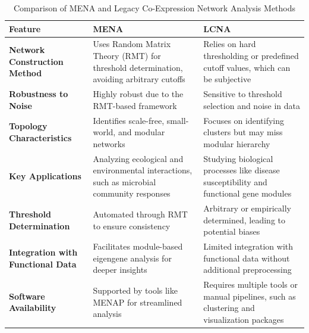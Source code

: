 \begin{table}[H]
\centering
\renewcommand{\arraystretch}{1.5} %
\begin{tabularx}{\textwidth}{@{}p{}X X@{}}
\toprule
\textbf{Feature} & \textbf{MENA} & \textbf{LCNA} \\
\midrule
\textbf{Network Construction Method} &
Uses Random Matrix Theory (RMT) for threshold determination, avoiding arbitrary cutoffs\cite{deng_molecular_2012} &
Relies on hard thresholding or predefined cutoff values, which can be subjective\cite{butte_discovering_2000} \\

\textbf{Robustness to Noise} &
Highly robust due to the RMT-based framework\cite{deng_molecular_2012} &
Sensitive to threshold selection and noise in data\cite{deng_molecular_2012} \\

\textbf{Topology Characteristics} &
Identifies scale-free, small-world, and modular networks\cite{deng_molecular_2012} &
Focuses on identifying clusters but may miss modular hierarchy\cite{horvath_analysis_2006} \\

\textbf{Key Applications} &
Analyzing ecological and environmental interactions, such as microbial community responses\cite{deng_molecular_2012} &
Studying biological processes like disease susceptibility and functional gene modules\cite{butte_discovering_2000,zhang_general_2005} \\

\textbf{Threshold Determination} &
Automated through RMT to ensure consistency\cite{deng_molecular_2012} &
Arbitrary or empirically determined, leading to potential biases\cite{deng_molecular_2012} \\

\textbf{Integration with Functional Data} &
Facilitates module-based eigengene analysis for deeper insights\cite{deng_molecular_2012} &
Limited integration with functional data without additional preprocessing\cite{horvath_analysis_2006} \\

\textbf{Software Availability} &
Supported by tools like MENAP for streamlined analysis\cite{deng_molecular_2012} &
Requires multiple tools or manual pipelines, such as clustering and visualization packages\cite{deng_molecular_2012} \\
\bottomrule
\end{tabularx}
\caption{Comparison of MENA and Legacy Co-Expression Network Analysis Methods}
\label{tab:mena_vs_lcna}
\end{table}

